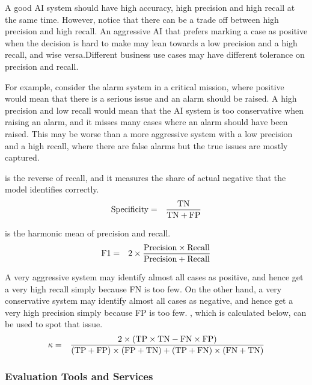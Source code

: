 A good AI system should have high accuracy, high precision and high recall at the same time. However, notice that there can be a trade off between high precision and high recall. An aggressive AI that prefers marking a case as positive when the decision is hard to make may lean towards a low precision and a high recall, and wise versa.Different business use cases may have different tolerance on precision and recall. 

For example, consider the alarm system in a critical mission, where positive would mean that there is a serious issue and an alarm should be raised. A high precision and low recall would mean that the AI system is too conservative when raising an alarm, and it misses many cases where an alarm should have been raised. This may be worse than a more aggressive system with a low precision and a high recall, where there are false alarms but the true issues are mostly captured.

 is the reverse of recall, and it measures the share of actual negative that the model identifies correctly.
\begin{eqnarray}
  \textup{Specificity} &=& \dfrac{\textup{TN}}{\textup{TN}+\textup{FP}} \nonumber
\end{eqnarray}

 is the harmonic mean of precision and recall.
\begin{eqnarray}
  \textup{F1} &=& 2\times \dfrac{\textup{Precision}\times\textup{Recall}}{\textup{Precision}+\textup{Recall}} \nonumber
\end{eqnarray}

A very aggressive system may identify almost all cases as positive, and hence get a very high recall simply because FN is too few. On the other hand, a very conservative system may identify almost all cases as negative, and hence get a very high precision simply because FP is too few. , which is calculated below, can be used to spot that issue.
\begin{eqnarray}
  \kappa &=& \dfrac{2\times\left(\textup{TP}\times\textup{TN}-\textup{FN}\times\textup{FP}\right)}{\left(\textup{TP}+\textup{FP}\right)\times\left(\textup{FP}+\textup{TN}\right)+\left(\textup{TP}+\textup{FN}\right)\times\left(\textup{FN}+\textup{TN}\right)}
  \nonumber
\end{eqnarray}

\subsubsection*{Evaluation Tools and Services}

